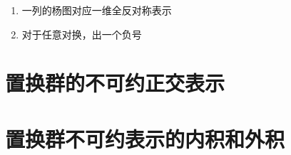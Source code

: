 \clearpage

\begin{note}
	\begin{enumerate}
		\item 
		一列的杨图对应一维全反对称表示
		\item 
		对于任意对换，出一个负号
	\end{enumerate}
\end{note}

















\section{置换群的不可约正交表示}


\section{置换群不可约表示的内积和外积}














